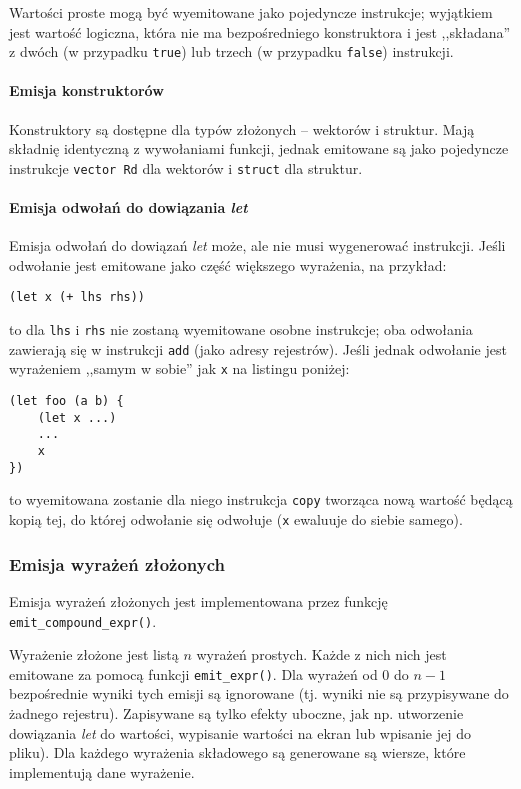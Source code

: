 Wartości proste mogą być wyemitowane jako pojedyncze instrukcje; wyjątkiem jest
wartość logiczna, która nie ma bezpośredniego konstruktora i jest ,,składana'' z
dwóch (w przypadku \texttt{true}) lub trzech (w przypadku \texttt{false})
instrukcji.

\paragraph{Emisja konstruktorów}

Konstruktory są dostępne dla typów złożonych -- wektorów i struktur. Mają
składnię identyczną z wywołaniami funkcji, jednak emitowane są jako pojedyncze
instrukcje \texttt{vector Rd} dla wektorów i \texttt{struct} dla struktur.

\paragraph{Emisja odwołań do dowiązania \emph{let}}

Emisja odwołań do dowiązań \emph{let} może, ale nie musi wygenerować instrukcji.
Jeśli odwołanie jest emitowane jako część większego wyrażenia, na przykład:
\begin{lstlisting}
(let x (+ lhs rhs))
\end{lstlisting}
to dla \texttt{lhs} i \texttt{rhs} nie zostaną wyemitowane osobne instrukcje;
oba odwołania zawierają się w instrukcji \texttt{add} (jako adresy rejestrów).
Jeśli jednak odwołanie jest wyrażeniem ,,samym w sobie'' jak \texttt{x} na
listingu poniżej:
\begin{lstlisting}
(let foo (a b) {
    (let x ...)
    ...
    x
})
\end{lstlisting}
to wyemitowana zostanie dla niego instrukcja \texttt{copy} tworząca nową wartość
będącą kopią tej, do której odwołanie się odwołuje (\texttt{x} ewaluuje do
siebie samego).

\subsubsection{Emisja wyrażeń złożonych}

Emisja wyrażeń złożonych jest implementowana przez funkcję \texttt{emit\_compound\_expr()}.

Wyrażenie złożone jest listą $n$ wyrażeń prostych. Każde z nich nich jest
emitowane za pomocą funkcji \texttt{emit\_expr()}. Dla wyrażeń od $0$ do $n-1$
bezpośrednie wyniki tych emisji są ignorowane (tj. wyniki nie są przypisywane do
żadnego rejestru). Zapisywane są tylko efekty uboczne, jak np. utworzenie
dowiązania \emph{let} do wartości, wypisanie wartości na ekran lub wpisanie jej
do pliku). Dla każdego wyrażenia składowego są generowane są wiersze, które
implementują dane wyrażenie.

